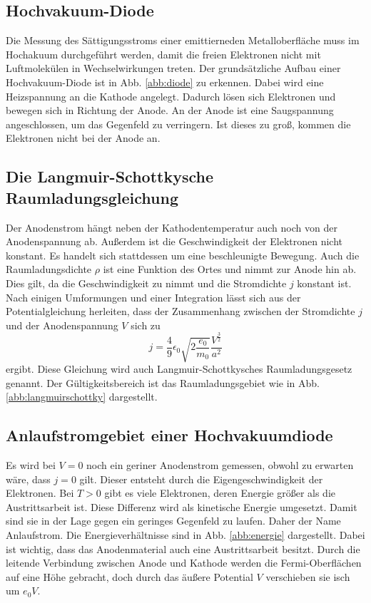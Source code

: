 \subsection{Hochvakuum-Diode}

Die Messung des Sättigungsstroms einer emittierneden 
Metalloberfläche muss im Hochakuum durchgeführt werden, 
damit die freien Elektronen nicht mit Luftmolekülen in 
Wechselwirkungen treten. Der grundsätzliche Aufbau einer 
Hochvakuum-Diode ist in Abb. \ref{abb:diode} zu erkennen. %
Dabei wird eine Heizspannung an die Kathode angelegt. Dadurch 
lösen sich Elektronen und bewegen sich in Richtung der Anode. 
An der Anode ist eine Saugspannung angeschlossen, um das 
Gegenfeld zu verringern. Ist dieses zu groß, kommen die 
Elektronen nicht bei der Anode an. 

\subsection{Die Langmuir-Schottkysche Raumladungsgleichung}

Der Anodenstrom hängt neben 
der Kathodentemperatur auch noch von der Anodenspannung 
ab. Außerdem ist die Geschwindigkeit der Elektronen nicht 
konstant. Es handelt sich stattdessen um eine beschleunigte 
Bewegung. Auch die Raumladungsdichte $\rho$ ist eine Funktion 
des Ortes und nimmt zur Anode hin ab. Dies gilt, da die 
Geschwindigkeit zu nimmt und die Stromdichte $j$ konstant ist. 
Nach einigen Umformungen und einer Integration lässt sich aus 
der Potentialgleichung herleiten, dass der Zusammenhang 
zwischen der Stromdichte $j$ und der Anodenspannung $V$ sich 
zu 
\begin{equation}
    j = \frac{4}{9} \epsilon_0 \sqrt{2 \frac{e_0}{m_0}} \frac{V^{\frac{3}{2}}}{a^2}
    \label{eqn:langmuirschottky}
\end{equation}
ergibt. Diese Gleichung wird auch Langmuir-Schottkysches 
Raumladungsgesetz genannt. Der Gültigkeitsbereich ist das 
Raumladungsgebiet wie in Abb. \ref{abb:langmuirschottky} 
dargestellt.  

\subsection{Anlaufstromgebiet einer Hochvakuumdiode}

Es wird bei $V = 0$ noch ein geriner Anodenstrom gemessen, 
obwohl zu erwarten wäre, dass $j = 0$ gilt. Dieser entsteht 
durch die Eigengeschwindigkeit der Elektronen. Bei $T > 0$ 
gibt es viele Elektronen, deren Energie größer als die 
Austrittsarbeit ist. Diese Differenz wird als kinetische 
Energie umgesetzt. Damit sind sie in der Lage gegen ein 
geringes Gegenfeld zu laufen. Daher der Name Anlaufstrom. 
Die Energieverhältnisse sind in Abb. \ref{abb:energie} 
dargestellt. Dabei ist wichtig, dass das Anodenmaterial auch 
eine Austrittsarbeit besitzt. Durch die leitende Verbindung 
zwischen Anode und Kathode werden die Fermi-Oberflächen auf 
eine Höhe gebracht, doch durch das äußere Potential $V$ 
verschieben sie isch um $e_0 V$. 

